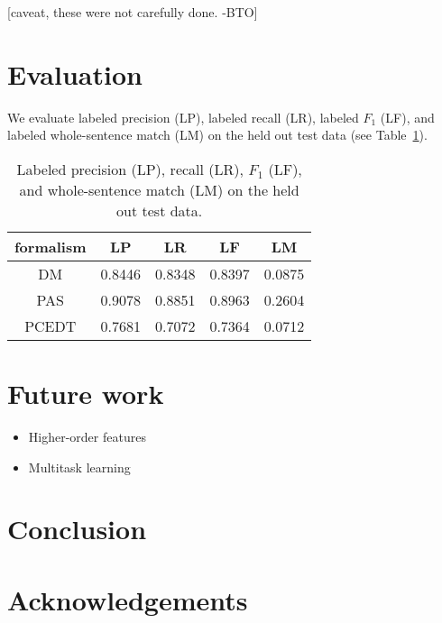 \documentclass[11pt]{article}
\newcommand{\bocomment}[1]{\textcolor{Bittersweet}{[#1 -BTO]}}
\begin{document}
\bocomment{caveat, these were not carefully done.}


\section{Evaluation}
\label{s:datasplits}

We evaluate labeled precision (LP), labeled recall (LR), labeled $F_1$ (LF), and
labeled whole-sentence match (LM) on the held out test data (see
Table~\ref{table:perf}).

% 
% 
% 
% 


\begin{table}
\begin{center}
\begin{tabular}{|c|c|c|c|c|}
\hline
formalism &
\multicolumn{1}{c}{LP} & \multicolumn{1}{c}{LR} &
\multicolumn{1}{c}{LF} &
\multicolumn{1}{c|}{LM} \\
\hline
DM & 0.8446 & 0.8348 & 0.8397 & 0.0875 \\
\hline
PAS & 0.9078 & 0.8851 & 0.8963 & 0.2604 \\
\hline
PCEDT & 0.7681 & 0.7072 & 0.7364 & 0.0712 \\
\hline
\end{tabular}
\caption{Labeled precision (LP), recall (LR), $F_1$ (LF), and
whole-sentence match (LM) on the held out test data.}
\label{table:perf}
\end{center}
\end{table}



\section{Future work}

\begin{itemize}
  \item Higher-order features
  \item Multitask learning
\end{itemize}


\section{Conclusion}

\nocite{flanigan-etal:ACL2014}



\section*{Acknowledgements}



\end{document}
